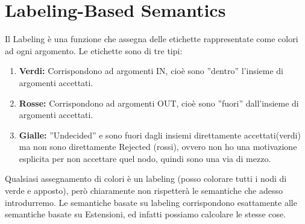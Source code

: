 \section{Labeling-Based Semantics}
Il Labeling è una funzione che assegna delle etichette rappresentate come
colori ad ogni argomento. Le etichette sono di tre tipi:
\begin{enumerate}
    \item \textbf{Verdi:} Corrispondono ad argomenti IN, cioè sono ”dentro”
          l'insieme di argomenti accettati.
    \item \textbf{Rosse:} Corrispondono ad argomenti OUT, cioè sono ”fuori”
          dall'insieme di argomenti accettati.
    \item \textbf{Gialle:} ”Undecided” e sono fuori dagli insiemi
          direttamente accettati(verdi) ma non sono direttamente Rejected (rossi),
          ovvero non ho una motivazione esplicita per non accettare quel nodo,
          quindi sono una via di mezzo.
\end{enumerate}
Qualsiasi assegnamento di colori è un labeling (posso colorare tutti i nodi
di verde e apposto), però chiaramente non rispetterà le semantiche che
adesso introdurremo. Le semantiche basate su labeling corrispondono
esattamente alle semantiche basate su Estensioni, ed infatti possiamo
calcolare le stesse cose.

